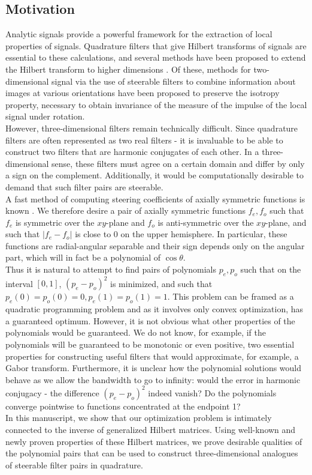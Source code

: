 \documentclass{article}
\theoremstyle{definition}
\theoremstyle{remark}
\numberwithin{equation}{section}
\begin{document}
\subsection{Motivation}
Analytic signals provide a powerful framework for the extraction of local properties of signals. Quadrature filters that give Hilbert transforms of signals are essential to these calculations, and several methods have been proposed to extend the Hilbert transform to higher dimensions \cite{boukerroui2004choice}. Of these, methods for two-dimensional signal via the use of steerable filters to combine information about images at various orientations have been proposed to preserve the isotropy property, necessary to obtain invariance of the measure of the impulse of the local signal under rotation. \\
However, three-dimensional filters remain technically difficult. Since quadrature filters are often represented as two real filters - it is invaluable to be able to construct two filters that are harmonic conjugates of each other. In a three-dimensional sense, these filters must agree on a certain domain and differ by only a sign on the complement. Additionally, it would be computationally desirable to demand that such filter pairs are steerable. \\
A fast method of computing steering coefficients of axially symmetric functions is known \cite{derpanis2005three}. We therefore desire a pair of axially symmetric functions $f_e, f_o$ such that $f_e$ is symmetric over the $xy$-plane and $f_o$ is anti-symmetric over the $xy$-plane, and such that $|f_e-f_o|$ is close to 0 on the upper hemisphere. In particular, these functions are radial-angular separable and their sign depends only on the angular part, which will in fact be a polynomial of $\cos \theta$. \\
Thus it is natural to attempt to find pairs of polynomials $p_e, p_o$ such that on the interval $[0,1]$, $(p_e-p_o)^2$ is minimized, and such that $p_e(0)=p_o(0)=0, p_e(1)=p_o(1)=1$. This problem can be framed as a quadratic programming problem and as it involves only convex optimization, has a guaranteed optimum. However, it is not obvious what other properties of the polynomials would be guaranteed. We do not know, for example, if the polynomials will be guaranteed to be monotonic or even positive, two essential properties for constructing useful filters that would approximate, for example, a Gabor transform. Furthermore, it is unclear how the polynomial solutions would behave as we allow the bandwidth to go to infinity: would the error in harmonic conjugacy - the difference $(p_e-p_o)^2$ indeed vanish? Do the polynomials converge pointwise to functions concentrated at the endpoint 1? \\
In this manuscript, we show that our optimization problem is intimately connected to the inverse of generalized Hilbert matrices. Using well-known and newly proven properties of these Hilbert matrices, we prove desirable qualities of the polynomial pairs that can be used to construct three-dimensional analogues of steerable filter pairs in quadrature. 
\end{document}
